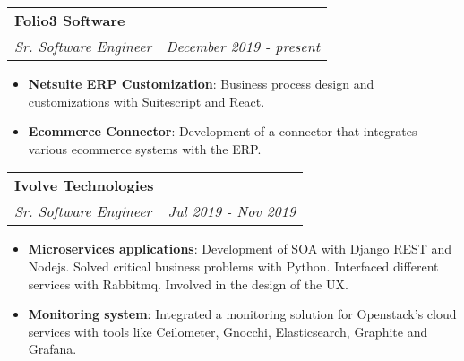 \documentclass[letterpaper,11pt]{article}
\makeatletter
\newcommand{\resumeItem}[2]{
\item\small{
	\textbf{#1}{: #2 \vspace{-2pt}}
}
}
\newcommand{\resumeSubheading}[4]{
\vspace{-1pt}\item
\begin{tabular*}{0.97\textwidth}{l@{\extracolsep{\fill}}r}
	\textbf{#1} & #2 \\
	\textit{\small#3} & \textit{\small #4} \\
\end{tabular*}\vspace{-5pt}
}
\newcommand{\resumeItemListStart}{\begin{itemize}}
\newcommand{\resumeItemListEnd}{\end{itemize}\vspace{-5pt}}
\makeatother
\begin{document}
\resumeSubheading
{Folio3 Software}{}
{Sr. Software Engineer}{December 2019 - present}
\resumeItemListStart
\resumeItem{Netsuite ERP Customization}
{Business process design and customizations with Suitescript and React.}
\resumeItem{Ecommerce Connector}
{Development of a connector that integrates various ecommerce systems with the ERP.}
\resumeItemListEnd
\resumeSubheading
{Ivolve Technologies}{}
{Sr. Software Engineer}{Jul 2019 - Nov 2019}
\resumeItemListStart
\resumeItem{Microservices applications}
{Development of SOA with Django REST and Nodejs. Solved critical business problems with Python. Interfaced different services with Rabbitmq. Involved in the design of the UX. }
\resumeItem{Monitoring system}
{Integrated a monitoring solution for Openstack's cloud services with tools like Ceilometer, Gnocchi, Elasticsearch, Graphite and Grafana.}

\resumeItemListEnd
\end{document}
